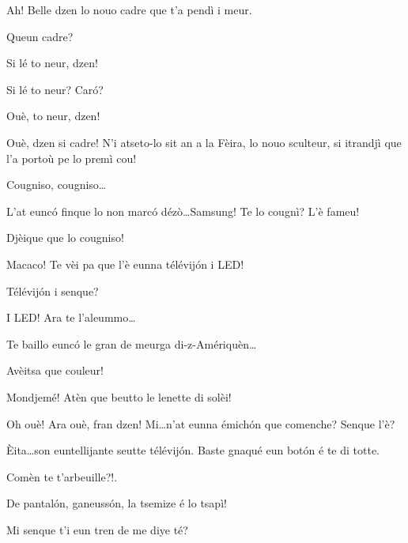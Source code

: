 \begin{drama}
\Vioujspeaks Ah! Belle dzen lo nouo cadre que t'a pendì i meur.

\Vioupspeaks Queun cadre?

\Vioujspeaks Si lé to neur, dzen!

\Vioupspeaks Si lé to neur? Car\'o?

\Vioujspeaks Ouè, to neur, dzen!

\Vioupspeaks Ouè, dzen si cadre! N'i atseto-lo sit an a la Fèira, lo nouo sculteur, si itrandjì que l'a portoù pe lo premì cou!

\Vioujspeaks Cougniso, cougniso\ldots

\Vioupspeaks L'at eunc\'o finque lo non marc\'o dézò\ldots Samsung! Te lo cougnì? L'è fameu!

\Vioujspeaks Djèique que lo cougniso!

\Vioupspeaks Macaco! Te vèi pa que l'è eunna télévij\'on i LED!

\Vioujspeaks{} Télévij\'on i senque?

\Vioupspeaks I LED! Ara te l'aleummo\ldots


\Vioupspeaks Te baillo eunc\'o le gran de meurga di-z-Amériquèn\ldots


\Vioupspeaks Avèitsa que couleur!

\Vioujspeaks Mondjemé! Atèn que beutto le lenette di solèi!


\Vioujspeaks Oh ouè! Ara ouè, fran dzen! Mi\ldots n'at eunna émich\'on que comenche? Senque l'è?

\Vioupspeaks \`Eita\ldots son euntellijante seutte télévij\'on. Baste gnaqué eun bot\'on é te di totte.


\Vioupspeaks \og Comèn te t'arbeuille?!\fg.

\Vioujspeaks{} De pantal\'on, ga\-neus\-s\'on, la tsemize é lo tsapì!

\Vioupspeaks Mi senque t'i eun tren de me diye té?


\end{drama}
